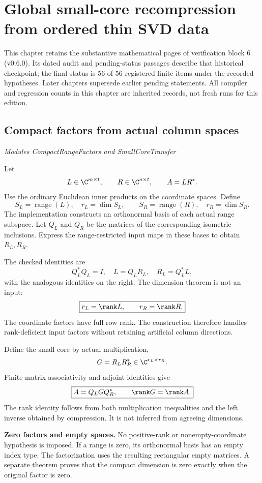 \clearpage\FloatBarrier\section{Global small-core recompression from ordered thin SVD data}\label{supp6:section:001}
This chapter retains the substantive mathematical pages of verification block 6 (v0.6.0). Its dated audit and pending-status passages describe that historical checkpoint; the final status is 56 of 56 registered finite items under the recorded hypotheses. Later chapters supersede earlier pending statements. All compiler and regression counts in this chapter are inherited records, not fresh runs for this edition.\par

\subsection{Compact factors from actual column spaces}\label{supp6:subsection:001}\textit{Modules CompactRangeFactors and SmallCoreTransfer}\par
Let
\[
L\in\C^{m\times t},\qquad R\in\C^{n\times t},\qquad A=LR^*.
\]
Use the ordinary Euclidean inner products on the coordinate spaces. Define
\[
S_L=\operatorname{range}(L),\quad r_L=\dim S_L,
\qquad S_R=\operatorname{range}(R),\quad r_R=\dim S_R.
\]
The implementation constructs an orthonormal basis of each actual range subspace. Let $Q_L$ and $Q_R$ be the matrices of the corresponding isometric inclusions. Express the range-restricted input maps in these bases to obtain $R_L,R_R$.

The checked identities are
\[
\boxed{Q_L^*Q_L=I,\quad L=Q_LR_L,\quad R_L=Q_L^*L,}
\]
with the analogous identities on the right. The dimension theorem is not an input:
\[
\boxed{r_L=\rank L,\qquad r_R=\rank R.}
\]
The coordinate factors have full row rank. The construction therefore handles rank-deficient input factors without retaining artificial column directions.

Define the small core by actual multiplication,
\[
G=R_LR_R^*\in\C^{r_L\times r_R}.
\]
Finite matrix associativity and adjoint identities give
\[
\boxed{A=Q_LGQ_R^*,\qquad \rank G=\rank A.}
\]
The rank identity follows from both multiplication inequalities and the left inverse obtained by compression. It is not inferred from agreeing dimensions.

\textbf{Zero factors and empty spaces.} No positive-rank or nonempty-coordinate hypothesis is imposed. If a range is zero, its orthonormal basis has an empty index type. The factorization uses the resulting rectangular empty matrices. A separate theorem proves that the compact dimension is zero exactly when the original factor is zero.

